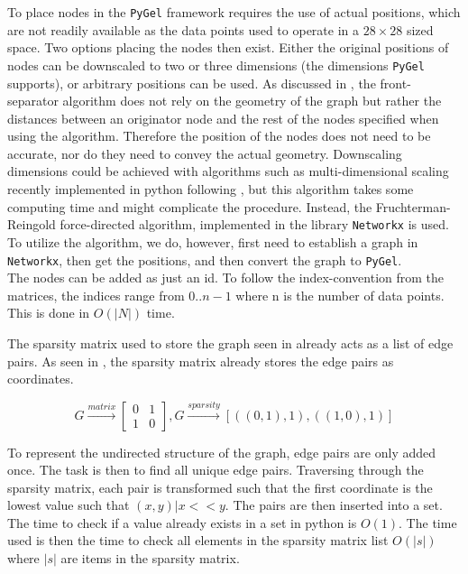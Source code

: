 \documentclass[10pt, letterpaper]{article}
\begin{document}
To place nodes in the \texttt{PyGel} framework requires the use of actual positions, which are not readily available as the data points used to operate in a $28\times28$ sized space. Two options placing the nodes then exist. Either the original positions of nodes can be downscaled to two or three dimensions (the dimensions \texttt{PyGel} supports), or arbitrary positions can be used. As discussed in , the front-separator algorithm does not rely on the geometry of the graph but rather the distances between an originator node and the rest of the nodes specified when using the algorithm. Therefore the position of the nodes does not need to be accurate, nor do they need to convey the actual geometry. Downscaling dimensions could be achieved with algorithms such as multi-dimensional scaling recently implemented in python following \cite{pymde}, but this algorithm takes some computing time and might complicate the procedure. Instead, the Fruchterman-Reingold force-directed algorithm, implemented in the library \texttt{Networkx} is used.\\
To utilize the algorithm, we do, however, first need to establish a graph in \texttt{Networkx}, then get the positions, and then convert the graph to \texttt{PyGel}.\\

The nodes can be added as just an id. To follow the index-convention from the matrices, the indices range from $0..n-1$ where n is the number of data points. This is done in $O(|N|)$ time.

The sparsity matrix used to store the graph seen in  already acts as a list of edge pairs. As seen in , the sparsity matrix already stores the edge pairs as coordinates.

\begin{equation}\label{eq:sparseex1}
    G \xrightarrow[]{matrix} 
    \begin{bmatrix}
        0 & 1 \\
        1 & 0 
    \end{bmatrix},
    G \xrightarrow[]{sparsity} 
    [((0, 1), 1), ((1, 0), 1)]
\end{equation}

To represent the undirected structure of the graph, edge pairs are only added once. The task is then to find all unique edge pairs. Traversing through the sparsity matrix, each pair is transformed such that the first coordinate is the lowest value such that $(x, y) | x << y$. The pairs are then inserted into a set. The time to check if a value already exists in a set in python is $O(1)$. The time used is then the time to check all elements in the sparsity matrix list $O(|s|)$ where $|s|$ are items in the sparsity matrix. \\
\end{document}
